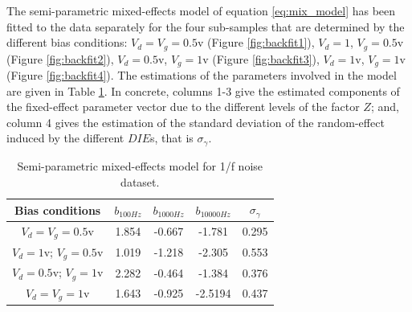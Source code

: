 \documentclass[sn-mathphys]{sn-jnl}%
\theoremstyle{thmstyleone}%
\theoremstyle{thmstyletwo}%
\theoremstyle{thmstylethree}%
\begin{document}
The semi-parametric mixed-effects model of equation \eqref{eq:mix_model} has been fitted to the data separately for the four sub-samples that are determined by the different bias conditions: $V_d=V_g=0.5$v (Figure \ref{fig:backfit1}),  $V_d=1$, $V_g=0.5$v (Figure \ref{fig:backfit2}), $V_d=0.5$v, $V_g=1$v (Figure \ref{fig:backfit3}), $V_d=1$v, $V_g=1$v (Figure \ref{fig:backfit4}). The estimations of the parameters involved in the model are given in Table \ref{tab:estim_noise}. In concrete, columns 1-3 give the estimated components of the fixed-effect parameter vector due to the different levels of the factor $Z$; and, column 4 gives the estimation of the standard deviation of the random-effect induced by the different $DIE$s, that is $\sigma_{\gamma}$.
\begin{table}[!t]
	\begin{center}
	
		\label{tab:estim_noise}
		\begin{tabular}{|c|c|c|c|c|} \hline
			Bias conditions     &$b_{100Hz}$  &$b_{1000Hz}$   &$b_{10000Hz}$     &$ \sigma_{\gamma}$ \\ \hline
			$V_d=V_g=0.5$v       &1.854  &-0.667 	&-1.781 	 &  0.295  \\ \hline
			$V_d=1$v; $V_g=0.5$v &1.019	 &-1.218  &-2.305 	 &  0.553 \\ \hline
			$V_d=0.5$v; $V_g=1$v &2.282  &-0.464  &-1.384	   &  0.376  \\ \hline
			$V_d=V_g=1$v         &1.643	 &-0.925  &-2.5194	 &  0.437  \\ \hline
		\end{tabular}
		\caption{Semi-parametric mixed-effects model for 1/f noise dataset.}
	\end{center}
\end{table}
\end{document}
